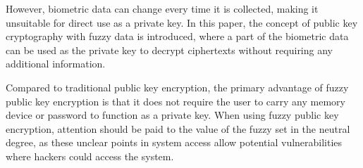 \documentclass[graybox]{svmult}
\begin{document}
However, biometric data can change every time it is collected, making it unsuitable for
direct use as a private key. In this paper, the concept of public key cryptography with
fuzzy data is introduced, where a part of the biometric data can be used as the private
key to decrypt ciphertexts without requiring any additional information.

Compared to traditional public key encryption, the primary advantage of fuzzy public key
encryption is that it does not require the user to carry any memory device or password to
function as a private key. When using fuzzy public key encryption, attention should be paid
to the value of the fuzzy set in the neutral degree, as these unclear points in system access
allow potential vulnerabilities where hackers could access the system.

\printbibliography
\end{document}
